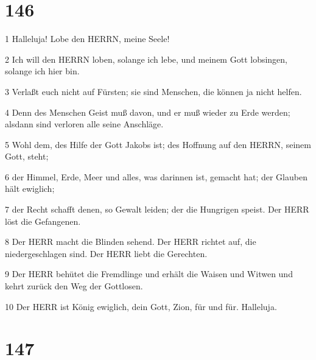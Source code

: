 \chapter{146}

\par 1 Halleluja! Lobe den HERRN, meine Seele!
\par 2 Ich will den HERRN loben, solange ich lebe, und meinem Gott lobsingen, solange ich hier bin.
\par 3 Verlaßt euch nicht auf Fürsten; sie sind Menschen, die können ja nicht helfen.
\par 4 Denn des Menschen Geist muß davon, und er muß wieder zu Erde werden; alsdann sind verloren alle seine Anschläge.
\par 5 Wohl dem, des Hilfe der Gott Jakobs ist; des Hoffnung auf den HERRN, seinem Gott, steht;
\par 6 der Himmel, Erde, Meer und alles, was darinnen ist, gemacht hat; der Glauben hält ewiglich;
\par 7 der Recht schafft denen, so Gewalt leiden; der die Hungrigen speist. Der HERR löst die Gefangenen.
\par 8 Der HERR macht die Blinden sehend. Der HERR richtet auf, die niedergeschlagen sind. Der HERR liebt die Gerechten.
\par 9 Der HERR behütet die Fremdlinge und erhält die Waisen und Witwen und kehrt zurück den Weg der Gottlosen.
\par 10 Der HERR ist König ewiglich, dein Gott, Zion, für und für. Halleluja.

\chapter{147}

